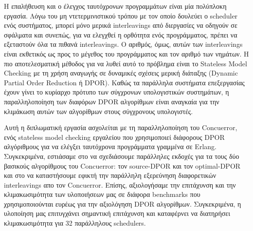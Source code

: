 Η επαλήθευση και ο έλεγχος ταυτόχρονων προγραμμάτων είναι μία πολύπλοκη εργασία. Λόγω του μη ντετερμινιστικού τρόπου με τον οποίο
δουλεύει ο scheduler ενός συστήματος, μπορεί μόνο μερικά interleavings από διεργασίες να οδηγούν σε σφάλματα και συνεπώς, 
για να ελεγχθεί η ορθότητα ενός προγράμματος, πρέπει να εξεταστούν όλα τα πιθανά interleavings. Ο αριθμός, όμως, αυτών των 
interleavings είναι εκθετικός ως προς το μέγεθος του προγράμματος και τον αριθμό των νημάτων. Η πιο αποτελεσματική μέθοδος για να λυθεί αυτό
το πρόβλημα είναι το Stateless Model Checking με τη χρήση αναγωγής σε δυναμικές
σχέσεις μερική διάταξης (Dynamic Partial Order Reduction ή DPOR). Καθώς τα παράλληλα συστήματα επεξεργασίας έχουν
γίνει το κυρίαρχο πρότυπο των σύγχρονων υπολογιστικών συστημάτων, η παραλληλοποίηση των διαφόρων DPOR αλγορίθμων είναι 
αναγκαία για την κλιμάκωση αυτών των αλγορίθμων στους σύγχρονους υπολογιστές.

Αυτή η διπλωματική εργασία ασχολείται με τη παραλληλοποίηση του Concuerror, ενός stateless model checking εργαλείου που χρησιμοποιεί
διάφορους DPOR αλγόριθμους για να ελέγξει ταυτόχρονα προγράμματα γραμμένα σε Erlang. Συγκεκριμένα, εστιάσαμε στο να σχεδιάσουμε 
παράλληλες εκδοχές για τα τους δύο βασικούς αλγορίθμους του Concuerror: τον source-DPOR και τον optimal-DPOR και στο
να καταστήσουμε εφικτή την παράλληλη εξερεύνηση διαφορετικών interleavings απο τον Concuerror.
Επίσης, αξιολογήσαμε την επιτάχυνση και την κλιμακωσιμότητα των υλοποιήσεων μας σε διάφορα benchmarks που 
χρησιμοποιούνται ευρέως για την αξιολόγηση DPOR αλγορίθμων. 
Συγκεκριμένα, η υλοποίηση μας επιτυγχάνει σημαντική επιτάχυνση και καταφέρνει να διατηρήσει κλιμακωσιμότητα για 32 παράλληλους schedulers.


